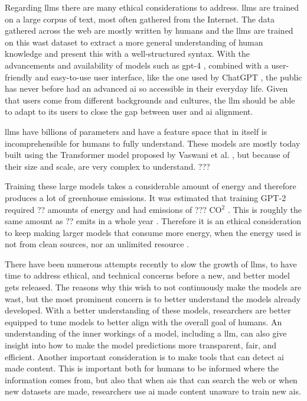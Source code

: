 Regarding \glspl{llm} there are many ethical considerations to address. \glspl{llm} are trained on a large corpus of text, most often gathered from the Internet. The data gathered across the web are mostly written by humans and the \glspl{llm} are trained on this wast dataset to extract a more general understanding of human knowledge and present this with a well-structured syntax. With the advancements and availability of models such as \gls{gpt}-4 \cite{openaiGPT4TechnicalReport2023}, combined with a user-friendly and easy-to-use user interface, like the one used by ChatGPT \cite{ChatGPT}, the public has never before had an advanced \gls{ai} so accessible in their everyday life. Given that users come from different backgrounds and cultures, the \gls{llm} should be able to adapt to its users to close the gap between user and \gls{ai} alignment. 

\glspl{llm} have billions of parameters and have a feature space that in itself is incomprehensible for humans to fully understand. These models are mostly today built using the Transformer model proposed by Vaswani et al. \cite{vaswaniAttentionAllYou2017}, but because of their size and scale, are very complex to understand. 
???


Training these large models takes a considerable amount of energy and therefore produces a lot of greenhouse emissions. It was estimated that training GPT-2 required ?? amounts of energy and had emissions of ??? CO$^2$ \cite{??}. This is roughly the same amount as ?? emits in a whole year \cite{???}. Therefore it is an ethical consideration to keep making larger models that consume more energy, when the energy used is not from clean sources, nor an unlimited resource \cite{??}.

There have been numerous attempts recently to slow the growth of \glspl{llm}, to have time to address ethical, and technical concerns before a new, and better model gets released. The reasons why this wish to not continuously make the models are wast, but the most prominent concern is to better understand the models already developed. With a better understanding of these models, researchers are better equipped to tune models to better align with the overall goal of humans. An understanding of the inner workings of a model, including a \gls{llm}, can also give insight into how to make the model predictions more transparent, fair, and efficient. Another important consideration is to make tools that can detect \gls{ai} made content. This is important both for humans to be informed where the information comes from, but also that when \glspl{ai} that can search the web or when new datasets are made, researchers use \gls{ai} made content unaware to train new \glspl{ai}.  

